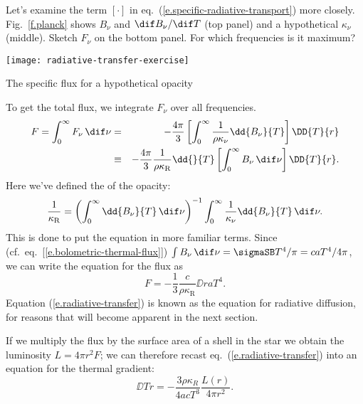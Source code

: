 \begin{exercisebox}
\label{ex.radiative-transfer}
Let's examine the term $\left[\cdot\right]$ in eq.~(\ref{e.specific-radiative-transport}) more closely. Fig.~\ref{f.planck} shows $B_{\nu}$ and $\dif B_{\nu}/\dif T$ (top panel) and a hypothetical $\kappa_{\nu}$ (middle). Sketch $F_{\nu}$ on the bottom panel.  For which frequencies is it maximum?
\end{exercisebox}

\begin{marginfigure}
\texttt{[image: radiative-transfer-exercise]}
\caption{\label{f.planck} The specific flux for a hypothetical opacity}
\end{marginfigure}

To get the total flux, we integrate $F_{\nu}$ over all frequencies. 
\begin{eqnarray*}
	F = \int_{0}^{\infty}F_{\nu}\,\dif\nu &=& -\frac{4\pi}{3} \left[\int_{0}^{\infty} \frac{1}{\rho\kappa_{\nu}}\dd{B_{\nu}}{T}\right]\DD{T}{r}\\
	&\equiv& -\frac{4\pi}{3}\frac{1}{\rho\kappa_{\mathrm{R}}}\dd{}{T}\left[\int_{0}^{\infty}B_{\nu}\,\dif\nu\right]\DD{T}{r}.
\end{eqnarray*}
Here we've defined the  of the opacity:
\begin{equation}\label{e.rosseland-opacity}
	\frac{1}{\kappa_{\mathrm{R}}} = \left(\int_{0}^{\infty} \dd{B_{\nu}}{T}\,\dif\nu\right)^{-1}\int_{0}^{\infty} \frac{1}{\kappa_{\nu}}\dd{B_{\nu}}{T}\,\dif\nu.
\end{equation}
This is done to put the equation in more familiar terms. Since (cf.\ eq.~[\ref{e.bolometric-thermal-flux}]) $\int B_{\nu}\,\dif\nu = \sigmaSB T^{4}/\pi = c a T^{4}/4\pi$, we can write the equation for the flux as
\begin{equation}
	F = -\frac{1}{3}\frac{c}{\rho\kappa_{\mathrm{R}}}\DD{}{r}aT^{4}.
\label{e.radiative-transfer}
\end{equation}
Equation (\ref{e.radiative-transfer}) is known as the equation for radiative diffusion, for reasons that will become apparent in the next section.

If we multiply the flux by the surface area of a shell in the star we obtain the luminosity $L = 4\pi r^{2} F$; we can therefore recast eq.~(\ref{e.radiative-transfer}) into an equation for the thermal gradient:
\begin{equation}
    \label{e.gradient-temperature}
    \DD{T}{r} = -\frac{3\rho\kappa_{R}}{4acT^3}\frac{L(r)}{4\pi r^2}.
\end{equation}

